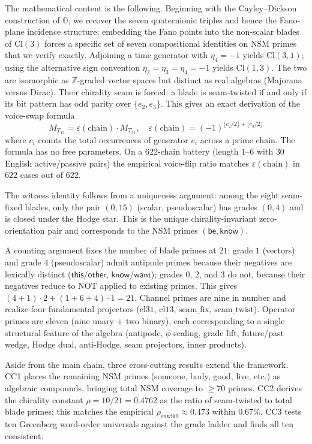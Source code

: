 \documentclass[11pt,a4paper]{article}
\theoremstyle{plain}
\theoremstyle{definition}
\theoremstyle{remark}
\numberwithin{equation}{section}
\providecommand{\Cl}{\mathrm{Cl}}
\providecommand{\OO}{\mathbb{O}}
\providecommand{\ZZ}{\mathbb{Z}}
\providecommand{\eps}{\varepsilon}
\providecommand{\seamfix}{\mathrm{seam\_fix}}
\providecommand{\seamtwist}{\mathrm{seam\_twist}}
\begin{document}
The mathematical content is the following.  Beginning with the
Cayley--Dickson construction of $\OO$, we recover the seven
quaternionic triples and hence the Fano-plane incidence structure;
embedding the Fano points into the non-scalar blades of $\Cl(3)$
forces a specific set of seven compositional identities on NSM
primes that we verify exactly.  Adjoining a time generator with
$\eta_4 = -1$ yields $\Cl(3,1)$; using the alternative sign
convention $\eta_2 = \eta_3 = \eta_4 = -1$ yields $\Cl(1,3)$.  The
two are isomorphic as $\ZZ$-graded vector spaces but distinct as
real algebras (Majorana versus Dirac).  Their chirality seam is
forced: a blade is seam-twisted if and only if its bit pattern has
odd parity over $\{e_2, e_3\}$.  This gives an exact derivation of
the voice-swap formula
\[
  M_{T_{13}} = \eps(\text{chain}) \cdot M_{T_{31}},
  \quad
  \eps(\text{chain}) = (-1)^{\lfloor c_2/2 \rfloor + \lfloor c_3/2 \rfloor}
\]
where $c_i$ counts the total occurrences of generator $e_i$ across a
prime chain.  The formula has no free parameters.  On a $622$-chain
battery (length $1$--$6$ with $30$ English active/passive pairs)
the empirical voice-flip ratio matches $\eps(\text{chain})$ in
$622$ cases out of $622$.

The witness identity follows from a uniqueness argument: among the
eight seam-fixed blades, only the pair $(0, 15)$ (scalar,
pseudoscalar) has grades $(0, 4)$ and is closed under the Hodge
star.  This is the unique chirality-invariant zero-orientation
pair and corresponds to the NSM primes
$(\mathsf{be}, \mathsf{know})$.

A counting argument fixes the number of blade primes at $21$:
grade $1$ (vectors) and grade $4$ (pseudoscalar) admit antipode
primes because their negatives are lexically distinct
($\mathsf{this}/\mathsf{other}$, $\mathsf{know}/\mathsf{want}$);
grades $0$, $2$, and $3$ do not, because their negatives reduce to
$\mathrm{NOT}$ applied to existing primes.  This gives
$(4 + 1) \cdot 2 + (1 + 6 + 4) \cdot 1 = 21$.  Channel primes are
nine in number and realize four fundamental projectors
($\mathrm{cl31}$, $\mathrm{cl13}$, $\seamfix$, $\seamtwist$).
Operator primes are eleven (nine unary + two binary), each
corresponding to a single structural feature of the algebra
(antipode, $\phi$-scaling, grade lift, future/past wedge, Hodge
dual, anti-Hodge, seam projectors, inner products).

Aside from the main chain, three cross-cutting results extend the
framework.  CC1 places the remaining NSM primes
(\textsf{someone}, \textsf{body}, \textsf{good}, \textsf{live},
etc.) as algebraic compounds, bringing total NSM coverage to
$\geq 70$ primes.  CC2 derives the chirality constant
$\rho = 10/21 = 0.4762$ as the ratio of seam-twisted to total
blade primes; this matches the empirical
$\rho_{\mathrm{enwik9}} \approx 0.473$ within $0.67\%$.  CC3 tests
ten Greenberg word-order universals against the grade ladder and
finds all ten consistent.
\end{document}

